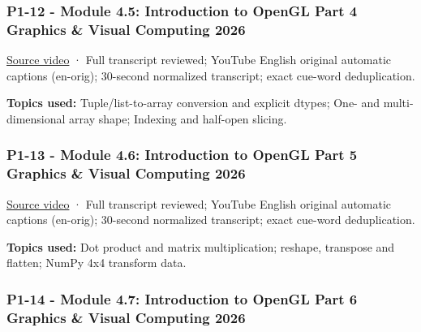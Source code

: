 \subsubsection{P1-12 - Module 4.5: Introduction to OpenGL Part 4 Graphics \& Visual Computing 2026}\label{04-visual-computing-ii-ch036-p1-12---module-4.5-introduction-to-opengl-part-4-graphics-visual-computing-2026}

\hypertarget{04-visual-computing-ii-ch036-p1-12---module-4.5-introduction-to-opengl-part-4-graphics-visual-computing-2026}{}

\href{https://www.youtube.com/watch?v=Eu4pGvCAOhI}{Source video} · Full transcript reviewed; YouTube English original automatic captions (en-orig); 30-second normalized transcript; exact cue-word deduplication.

\textbf{Topics used:} Tuple/list-to-array conversion and explicit dtypes; One- and multi-dimensional array shape; Indexing and half-open slicing.

\subsubsection{P1-13 - Module 4.6: Introduction to OpenGL Part 5 Graphics \& Visual Computing 2026}\label{04-visual-computing-ii-ch036-p1-13---module-4.6-introduction-to-opengl-part-5-graphics-visual-computing-2026}

\hypertarget{04-visual-computing-ii-ch036-p1-13---module-4.6-introduction-to-opengl-part-5-graphics-visual-computing-2026}{}

\href{https://www.youtube.com/watch?v=e2GQBMBWyh0}{Source video} · Full transcript reviewed; YouTube English original automatic captions (en-orig); 30-second normalized transcript; exact cue-word deduplication.

\textbf{Topics used:} Dot product and matrix multiplication; reshape, transpose and flatten; NumPy 4x4 transform data.

\subsubsection{P1-14 - Module 4.7: Introduction to OpenGL Part 6 Graphics \& Visual Computing 2026}\label{04-visual-computing-ii-ch036-p1-14---module-4.7-introduction-to-opengl-part-6-graphics-visual-computing-2026}

\hypertarget{04-visual-computing-ii-ch036-p1-14---module-4.7-introduction-to-opengl-part-6-graphics-visual-computing-2026}{}

